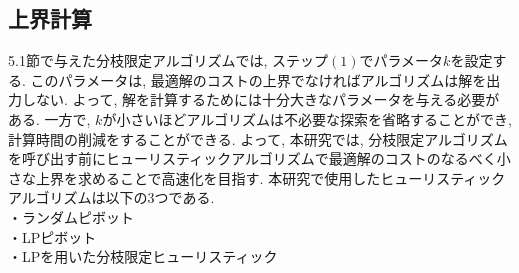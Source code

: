 \documentclass[10.5,a4paper,titlepage, dvipdfmx]{bxjsarticle}
\begin{document}
\subsection{上界計算}
5.1節で与えた分枝限定アルゴリズムでは, ステップ$(1)$でパラメータ$k$を設定する.
このパラメータは, 最適解のコストの上界でなければアルゴリズムは解を出力しない.
よって, 解を計算するためには十分大きなパラメータを与える必要がある.
一方で, $k$が小さいほどアルゴリズムは不必要な探索を省略することができ, 計算時間の削減をすることができる.
よって, 本研究では, 分枝限定アルゴリズムを呼び出す前にヒューリスティックアルゴリズムで最適解のコストのなるべく小さな上界を求めることで高速化を目指す.
本研究で使用したヒューリスティックアルゴリズムは以下の3つである.\\
・ランダムピボット\\
・LPピボット\\
・LPを用いた分枝限定ヒューリスティック\\
\end{document}
